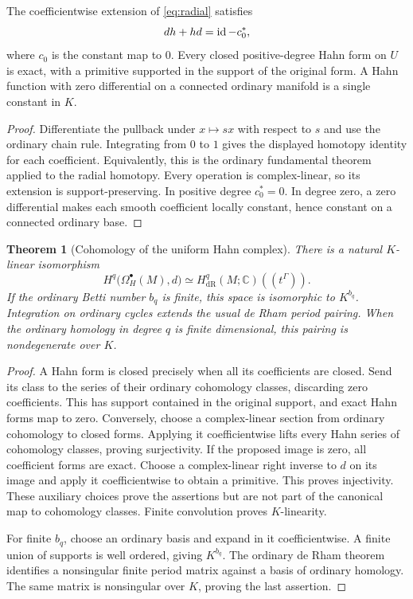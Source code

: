 \documentclass[11pt,letterpaper]{article}
\newtheorem{theorem}{Theorem}[section]
\theoremstyle{definition}
\theoremstyle{remark}
\newcommand{\C}{\mathbb C}\newcommand{\R}{\mathbb R}\newcommand{\Q}{\mathbb Q}\newcommand{\Z}{\mathbb Z}\newcommand{\N}{\mathbb N}
\newcommand{\dR}{\mathrm{dR}}\newcommand{\sh}{^{\sharp}}\newcommand{\abs}[1]{\left|#1\right|}
\numberwithin{equation}{section}
\begin{document}
\begin{proposition}\label{prop:poincare}
The coefficientwise extension of \eqref{eq:radial} satisfies
\[
 dh+hd=\operatorname{id}-c_0^*,
\]
where $c_0$ is the constant map to $0$. Every closed positive-degree Hahn form on $U$ is exact, with a primitive supported in the support of the original form. A Hahn function with zero differential on a connected ordinary manifold is a single constant in $K$.
\end{proposition}
\begin{proof}
Differentiate the pullback under $x\mapsto sx$ with respect to $s$ and use the ordinary chain rule. Integrating from $0$ to $1$ gives the displayed homotopy identity for each coefficient. Equivalently, this is the ordinary fundamental theorem applied to the radial homotopy. Every operation is complex-linear, so its extension is support-preserving. In positive degree $c_0^*=0$. In degree zero, a zero differential makes each smooth coefficient locally constant, hence constant on a connected ordinary base.
\end{proof}

\begin{theorem}[Cohomology of the uniform Hahn complex]\label{thm:cohomology}
There is a natural $K$-linear isomorphism
\begin{equation}\label{eq:cohomology}
 H^q\bigl(\Omega_H^\bullet(M),d\bigr)
 \simeq H^q_{\dR}(M;\C)((t^\Gamma)).
\end{equation}
If the ordinary Betti number $b_q$ is finite, this space is isomorphic to $K^{b_q}$. Integration on ordinary cycles extends the usual de Rham period pairing. When the ordinary homology in degree $q$ is finite dimensional, this pairing is nondegenerate over $K$.
\end{theorem}
\begin{proof}
A Hahn form is closed precisely when all its coefficients are closed. Send its class to the series of their ordinary cohomology classes, discarding zero coefficients. This has support contained in the original support, and exact Hahn forms map to zero. Conversely, choose a complex-linear section from ordinary cohomology to closed forms. Applying it coefficientwise lifts every Hahn series of cohomology classes, proving surjectivity. If the proposed image is zero, all coefficient forms are exact. Choose a complex-linear right inverse to $d$ on its image and apply it coefficientwise to obtain a primitive. This proves injectivity. These auxiliary choices prove the assertions but are not part of the canonical map to cohomology classes. Finite convolution proves $K$-linearity.

For finite $b_q$, choose an ordinary basis and expand in it coefficientwise. A finite union of supports is well ordered, giving $K^{b_q}$. The ordinary de Rham theorem identifies a nonsingular finite period matrix against a basis of ordinary homology. The same matrix is nonsingular over $K$, proving the last assertion.
\end{proof}
\end{document}
